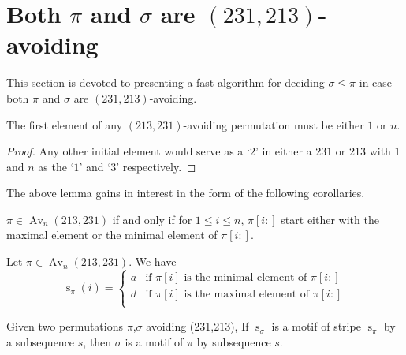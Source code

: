 \documentclass[a4paper]{llncs}
\DeclareMathOperator{\AV}{Av}
\newcommand{\ptext}{\pi}
\newcommand{\pmotif}{\sigma}
\DeclareMathOperator{\stripea}{s}
\newcommand{\stripe}[2]{\stripea_{{#1}}({#2})}
\newcommand{\stripew}[1]{\stripea_{{#1}}}
\newcommand{\dstep}{d}
\newcommand{\ustep}{a}
\begin{document}

\section{Both $\pi$ and $\sigma$ are $(231,213)$-avoiding}
\label{section:both are (231,213)-avoiding}

This section is devoted to presenting a fast algorithm for deciding
$\sigma \leq \pi$ 
in case both $\pi$ and $\sigma$ are $(231,213)$-avoiding.

\begin{lemma}[Folklore]
\label{lemma:first element is 1 or n}
The first element of any $(213,231)$-avoiding permutation
must be either $1$ or $n$.
\end{lemma}

\begin{proof} 
Any other initial element would serve as a `$2$' in either a 
$231$ or $213$ with $1$ and $n$ as the `$1$' and `$3$' respectively.
\end{proof}
	
The above lemma gains in interest in the form of the following corollaries.

\begin{corollary}
\label{corollary:minmaxelement}
$\pi \in \AV_n(213,231)$ if and only if for $1 \leq i \leq n$, 
$\pi[i:]$ start either with the maximal element
or the minimal element of $\pi[i:]$.
\end{corollary}
	
\begin{corollary}
Let $\pi \in \AV_n(213,231)$. We have
$$
\stripe{\pi}{i} =
\begin{cases}
			\ustep & \text{if $\pi[i]$ is the minimal element of $\pi[i:]$}\\    
			\dstep & \text{if $\pi[i]$ is the maximal element of $\pi[i:]$}\\
	\end{cases}
	$$
\end{corollary}
	 
\begin{lemma}
\label{lemma:MatchStripeToPermutation}
Given two permutations $\ptext$,$\pmotif$ avoiding (231,213), If $\stripew{\pmotif}$ is a motif of stripe $\stripew{\ptext}$ by a subsequence $s$, then $\pmotif$ is a motif of $\ptext$ by subsequence $s$.
\end{lemma}	 
	 
\end{document}
